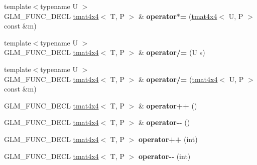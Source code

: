 \begin{DoxyCompactItemize}
\item 
\mbox{\label{structglm_1_1tmat4x4_a5265dee9e6fd517e9d0ce28b006ad35b}} 
{\footnotesize template$<$typename U $>$ }\\G\+L\+M\+\_\+\+F\+U\+N\+C\+\_\+\+D\+E\+CL \hyperlink{structglm_1_1tmat4x4}{tmat4x4}$<$ T, P $>$ \& {\bfseries operator$\ast$=} (\hyperlink{structglm_1_1tmat4x4}{tmat4x4}$<$ U, P $>$ const \&m)
\item 
\mbox{\label{structglm_1_1tmat4x4_a1dff23012c9f5451ebaf7d96934f60cb}} 
{\footnotesize template$<$typename U $>$ }\\G\+L\+M\+\_\+\+F\+U\+N\+C\+\_\+\+D\+E\+CL \hyperlink{structglm_1_1tmat4x4}{tmat4x4}$<$ T, P $>$ \& {\bfseries operator/=} (U s)
\item 
\mbox{\label{structglm_1_1tmat4x4_a0dc88dbbec27980b19dd322695bb2eab}} 
{\footnotesize template$<$typename U $>$ }\\G\+L\+M\+\_\+\+F\+U\+N\+C\+\_\+\+D\+E\+CL \hyperlink{structglm_1_1tmat4x4}{tmat4x4}$<$ T, P $>$ \& {\bfseries operator/=} (\hyperlink{structglm_1_1tmat4x4}{tmat4x4}$<$ U, P $>$ const \&m)
\item 
\mbox{\label{structglm_1_1tmat4x4_a1ad2e416dfded77b7c5b9c7cc5593a82}} 
G\+L\+M\+\_\+\+F\+U\+N\+C\+\_\+\+D\+E\+CL \hyperlink{structglm_1_1tmat4x4}{tmat4x4}$<$ T, P $>$ \& {\bfseries operator++} ()
\item 
\mbox{\label{structglm_1_1tmat4x4_a609557d02e1794629bca91f52f74626a}} 
G\+L\+M\+\_\+\+F\+U\+N\+C\+\_\+\+D\+E\+CL \hyperlink{structglm_1_1tmat4x4}{tmat4x4}$<$ T, P $>$ \& {\bfseries operator-\/-\/} ()
\item 
\mbox{\label{structglm_1_1tmat4x4_aa3265b4bdfd401c53ffabe57f631f1ca}} 
G\+L\+M\+\_\+\+F\+U\+N\+C\+\_\+\+D\+E\+CL \hyperlink{structglm_1_1tmat4x4}{tmat4x4}$<$ T, P $>$ {\bfseries operator++} (int)
\item 
\mbox{\label{structglm_1_1tmat4x4_ab1c8914e89847162b577d27d79a2b352}} 
G\+L\+M\+\_\+\+F\+U\+N\+C\+\_\+\+D\+E\+CL \hyperlink{structglm_1_1tmat4x4}{tmat4x4}$<$ T, P $>$ {\bfseries operator-\/-\/} (int)
\item 

\end{DoxyCompactItemize}
